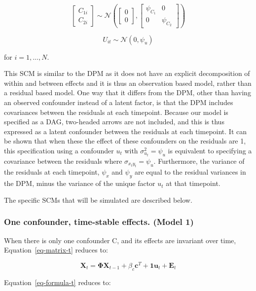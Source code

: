 \documentclass[
]{interact}
\begin{document}
\[
\begin{bmatrix}
C_{1i}\\
C_{2i}
\end{bmatrix} \sim \mathcal{N}\left(\begin{bmatrix} 0\\0 \end{bmatrix}, \begin{bmatrix}\psi_{C_1} & 0 \\0 & \psi_{C_2} \end{bmatrix} \right)
\]

\[
U_{it} \sim \mathcal{N}\left(0, \psi_u\right)
\]

for \(i = 1,...,N\).

This SCM is similar to the DPM as it does not have an explicit
decomposition of within and between effects and it is thus an
observation based model, rather than a residual based model. One way
that it differs from the DPM, other than having an observed confounder
instead of a latent factor, is that the DPM includes covariances between
the residuals at each timepoint. Because our model is specified as a
DAG, two-headed arrows are not included, and this is thus expressed as a
latent confounder between the residuals at each timepoint. It can be
shown that when these the effect of these confounders on the residuals
are 1, this specification using a confounder \(u_t\) with
\(\sigma_{u_t}^2 = \psi_u\) is equivalent to specifying a covariance
between the residuals where \(\sigma_{x_ty_t} = \psi_u\). Furthermore,
the variance of the residuals at each timepoint, \(\psi_x\) and
\(\psi_y\) are equal to the residual variances in the DPM, minus the
variance of the unique factor \(u_t\) at that timepoint.

The specific SCMs that will be simulated are described below.

\hypertarget{one-confounder-time-stable-effects.-model-1}{%
\subsubsection{One confounder, time-stable effects. (Model
1)}\label{one-confounder-time-stable-effects.-model-1}}

When there is only one confounder C, and its effects are invariant over
time, Equation~\ref{eq-matrix-t} reduces to:

\[
\textbf{X}_t = \boldsymbol{\Phi}\textbf{X}_{t-1} + \beta_{c}\textbf{c}^T + \textbf{1}\textbf{u}_t + \textbf{E}_t
\]

Equation~\ref{eq-formula-t} reduces to:
\end{document}
